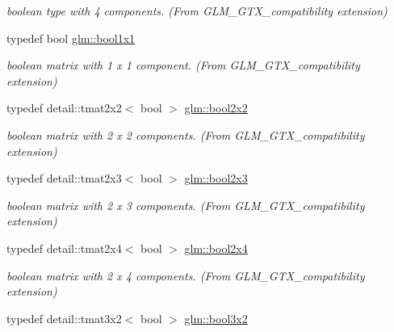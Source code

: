 \begin{DoxyCompactItemize}
\begin{DoxyCompactList}\small\item\em boolean type with 4 components. (From G\+L\+M\+\_\+\+G\+T\+X\+\_\+compatibility extension) \end{DoxyCompactList}\item 
\hypertarget{group__gtx__compatibility_ga98d9d3da22aebc872ba38ce5afa0eff7}{}typedef bool \hyperlink{group__gtx__compatibility_ga98d9d3da22aebc872ba38ce5afa0eff7}{glm\+::bool1x1}\label{group__gtx__compatibility_ga98d9d3da22aebc872ba38ce5afa0eff7}

\begin{DoxyCompactList}\small\item\em boolean matrix with 1 x 1 component. (From G\+L\+M\+\_\+\+G\+T\+X\+\_\+compatibility extension) \end{DoxyCompactList}\item 
\hypertarget{group__gtx__compatibility_ga2dcf19dcbce2879d1d538cb241538fda}{}typedef detail\+::tmat2x2$<$ bool $>$ \hyperlink{group__gtx__compatibility_ga2dcf19dcbce2879d1d538cb241538fda}{glm\+::bool2x2}\label{group__gtx__compatibility_ga2dcf19dcbce2879d1d538cb241538fda}

\begin{DoxyCompactList}\small\item\em boolean matrix with 2 x 2 components. (From G\+L\+M\+\_\+\+G\+T\+X\+\_\+compatibility extension) \end{DoxyCompactList}\item 
\hypertarget{group__gtx__compatibility_ga6b51fa8f26cb730ce19a7f7dfe68adf2}{}typedef detail\+::tmat2x3$<$ bool $>$ \hyperlink{group__gtx__compatibility_ga6b51fa8f26cb730ce19a7f7dfe68adf2}{glm\+::bool2x3}\label{group__gtx__compatibility_ga6b51fa8f26cb730ce19a7f7dfe68adf2}

\begin{DoxyCompactList}\small\item\em boolean matrix with 2 x 3 components. (From G\+L\+M\+\_\+\+G\+T\+X\+\_\+compatibility extension) \end{DoxyCompactList}\item 
\hypertarget{group__gtx__compatibility_ga947d6675299e353f981861894947cfc5}{}typedef detail\+::tmat2x4$<$ bool $>$ \hyperlink{group__gtx__compatibility_ga947d6675299e353f981861894947cfc5}{glm\+::bool2x4}\label{group__gtx__compatibility_ga947d6675299e353f981861894947cfc5}

\begin{DoxyCompactList}\small\item\em boolean matrix with 2 x 4 components. (From G\+L\+M\+\_\+\+G\+T\+X\+\_\+compatibility extension) \end{DoxyCompactList}\item 
\hypertarget{group__gtx__compatibility_ga29ae3d24d32b2fd95e65b1a459c1818a}{}typedef detail\+::tmat3x2$<$ bool $>$ \hyperlink{group__gtx__compatibility_ga29ae3d24d32b2fd95e65b1a459c1818a}{glm\+::bool3x2}\label{group__gtx__compatibility_ga29ae3d24d32b2fd95e65b1a459c1818a}


\end{DoxyCompactItemize}
